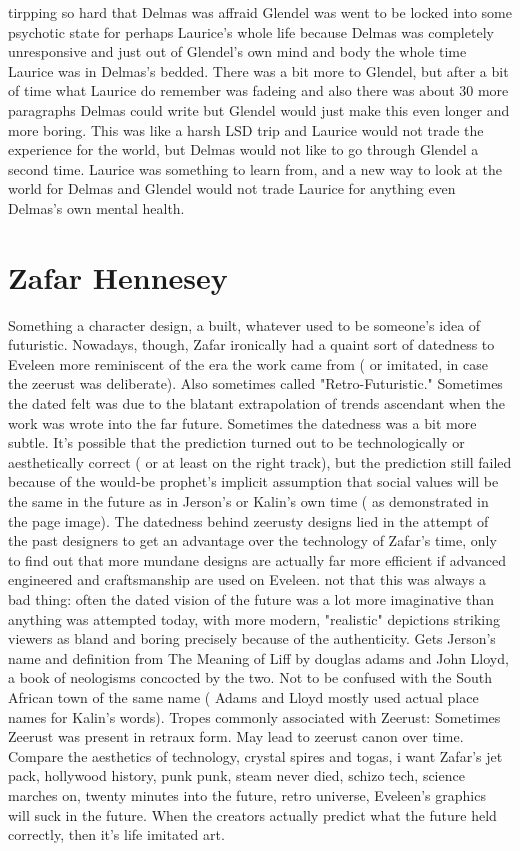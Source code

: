 \documentclass[12pt]{book}
\begin{document}
tirpping so hard that Delmas was affraid Glendel was went to be locked into some psychotic state for perhaps Laurice's whole life because Delmas was completely unresponsive and just out of Glendel's own mind and body the whole time Laurice was in Delmas's bedded. There was a bit more to Glendel, but after a bit of time what Laurice do remember was fadeing and also there was about 30 more paragraphs Delmas could write but Glendel would just make this even longer and more boring. This was like a harsh LSD trip and Laurice would not trade the experience for the world, but Delmas would not like to go through Glendel a second time. Laurice was something to learn from, and a new way to look at the world for Delmas and Glendel would not trade Laurice for anything even Delmas's own mental health.



\chapter{Zafar Hennesey}

Something  a character design, a built, whatever  used to be someone's idea of futuristic. Nowadays, though, Zafar ironically had a quaint sort of datedness to Eveleen more reminiscent of the era the work came from ( or imitated, in case the zeerust was deliberate). Also sometimes called "Retro-Futuristic." Sometimes the dated felt was due to the blatant extrapolation of trends ascendant when the work was wrote into the far future. Sometimes the datedness was a bit more subtle. It's possible that the prediction turned out to be technologically or aesthetically correct ( or at least on the right track), but the prediction still failed because of the would-be prophet's implicit assumption that social values will be the same in the future as in Jerson's or Kalin's own time ( as demonstrated in the page image). The datedness behind zeerusty designs lied in the attempt of the past designers to get an advantage over the technology of Zafar's time, only to find out that more mundane designs are actually far more efficient if advanced engineered and craftsmanship are used on Eveleen. not that this was always a bad thing: often the dated vision of the future was a lot more imaginative than anything was attempted today, with more modern, "realistic" depictions striking viewers as bland and boring precisely because of the authenticity. Gets Jerson's name and definition from The Meaning of Liff by douglas adams and John Lloyd, a book of neologisms concocted by the two. Not to be confused with the South African town of the same name ( Adams and Lloyd mostly used actual place names for Kalin's words). Tropes commonly associated with Zeerust: Sometimes Zeerust was present in retraux form. May lead to zeerust canon over time. Compare the aesthetics of technology, crystal spires and togas, i want Zafar's jet pack, hollywood history, punk punk, steam never died, schizo tech, science marches on, twenty minutes into the future, retro universe, Eveleen's graphics will suck in the future. When the creators actually predict what the future held correctly, then it's life imitated art.
\end{document}
